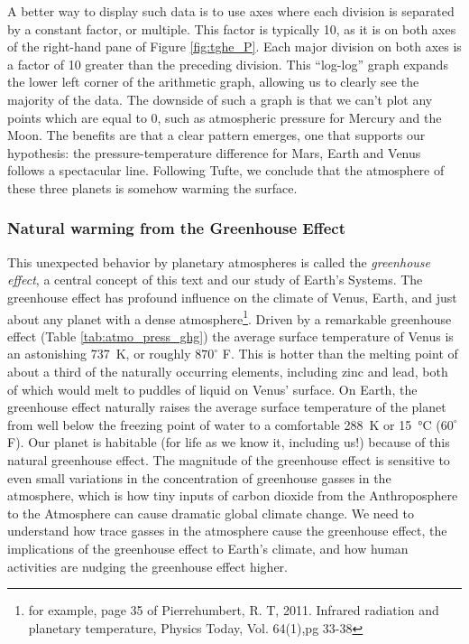 \documentclass[amstex,12pt]{book}
\begin{document}
A better way to display such data is to use axes where each division is separated by a constant factor, or multiple. This factor is typically 10, as it is on both axes of the right-hand pane of Figure \ref{fig:tghe_P}. Each major division on both axes is a factor of 10 greater than the preceding division. This ``log-log'' graph expands the lower left corner of the arithmetic graph, allowing us to clearly see the majority of the data. The downside of such a graph is that we can’t plot any points which are equal to 0, such as atmospheric pressure for Mercury and the Moon. The benefits are that a clear pattern emerges, one that supports our hypothesis: the pressure-temperature difference for Mars, Earth and Venus follows a spectacular line. Following Tufte, we conclude that the atmosphere of these three planets is somehow warming the surface.\\

\subsubsection{Natural warming from the Greenhouse Effect}
This unexpected behavior by planetary atmospheres is called the \emph{greenhouse effect}, a central concept of this text and our study of Earth's Systems. The greenhouse effect has profound influence on the climate of Venus, Earth, and just about any planet with a dense atmosphere\footnote{for example, page 35 of Pierrehumbert, R. T, 2011. Infrared radiation and planetary temperature, Physics Today, Vol. 64(1),pg 33-38}. Driven by a remarkable greenhouse effect (Table \ref{tab:atmo_press_ghg}) the average surface temperature of Venus is an astonishing \SI{737}{\kelvin}, or roughly ${870}^{\circ}$ F. This is hotter than the melting point of about a third of the naturally occurring elements, including zinc and lead, both of which would melt to puddles of liquid on Venus' surface. On Earth, the greenhouse effect naturally raises the average surface temperature of the planet from well below the freezing point of water to a comfortable \SI{288}{\kelvin} or \SI{15}{\celsius} (${60}^{\circ}$ F). Our planet is habitable (for life as we know it, including us!) because of this natural greenhouse effect. The magnitude of the greenhouse effect is sensitive to even small variations in the concentration of greenhouse gasses in the atmosphere, which is how tiny inputs of carbon dioxide from the Anthroposphere to the Atmosphere can cause dramatic global climate change. We need to understand how trace gasses in the atmosphere cause the greenhouse effect, the implications of the greenhouse effect to Earth’s climate, and how human activities are nudging the greenhouse effect higher.
\end{document}
